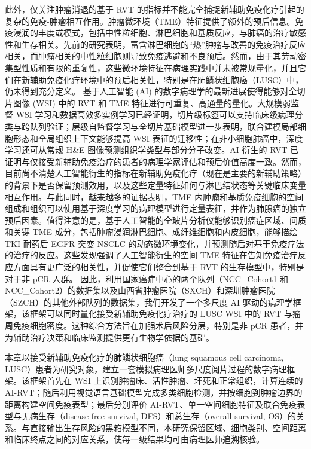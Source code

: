此外，仅关注肿瘤消退的基于 RVT 的指标并不能完全捕捉新辅助免疫化疗引起的复杂的免疫-肿瘤相互作用。肿瘤微环境（TME）特征提供了额外的预后信息。免疫浸润的丰度或模式，包括中性粒细胞、淋巴细胞和基质反应，与肺癌的治疗敏感性和生存相关\cite{wu2024coldhot,teijeira2021il8,miao2024neutrophilsnsclc,hu2025neutrophilpd1}。先前的研究表明，富含淋巴细胞的“热”肿瘤与改善的免疫治疗反应相关\cite{wu2024coldhot}，而肿瘤相关的中性粒细胞则导致免疫逃避和不良预后\cite{teijeira2021il8,miao2024neutrophilsnsclc,hu2025neutrophilpd1}。然而，由于其劳动密集型性质和有限的重复性，这些微环境特征在病理实践中并未被常规量化，并且它们在新辅助免疫化疗环境中的预后相关性，特别是在肺鳞状细胞癌（LUSC）中，仍未得到充分定义。
基于人工智能 (AI) 的数字病理学的最新进展使得能够对全切片图像 (WSI) 中的 RVT 和 TME 特征进行可重复、高通量的量化。大规模弱监督 WSI 学习和数据高效多实例学习已经证明，切片级标签可以支持临床级病理分类与跨队列验证\cite{campanella2019clinical,lu2021clam,ilse2018attentionmil,li2021dsmil,shao2021transmil}；层级自监督学习与全切片基础模型进一步表明，联合建模局部细胞形态和全局组织上下文能够提高 WSI 表征的迁移性\cite{chen2022hipt,xu2024gigapath}；在非小细胞肺癌中，深度学习还可从常规 H\&E 图像预测组织学类型与部分分子改变\cite{coudray2018lung}。AI 衍生的 RVT 已证明与仅接受新辅助免疫治疗的患者的病理学家评估和预后价值高度一致\cite{dacic2024lcmc3}。然而，目前尚不清楚人工智能衍生的指标在新辅助免疫化疗（现在是主要的新辅助策略）的背景下是否保留预测效用，以及这些定量特征如何与淋巴结状态等关键临床变量相互作用。与此同时，越来越多的证据表明，TME 内肿瘤和基质免疫细胞的空间组成和组织可以使用基于深度学习的病理模型进行定量表征，并作为肺腺癌的独立预后因素\cite{wang2020compstaining,wang2019convpath}。值得注意的是，基于人工智能的全玻片分析仪能够识别癌症区域、间质和关键 TME 成分，包括肿瘤浸润淋巴细胞、成纤维细胞和内皮细胞，能够描绘 TKI 耐药后 EGFR 突变 NSCLC 的动态微环境变化，并预测随后对基于免疫疗法的治疗的反应\cite{bang2025egfrspatial}。这些发现强调了人工智能衍生的空间 TME 特征在告知免疫治疗反应方面具有更广泛的相关性，并促使它们整合到基于 RVT 的生存模型中，特别是对于非 pCR 人群。
因此，利用国家癌症中心的两个队列（NCC\_Cohort1 和 NCC\_Cohort2）的数据集以及山西省肿瘤医院（SXCH）和深圳肿瘤医院（SZCH）的其他外部队列的数据集，我们开发了一个多尺度 AI 驱动的病理学框架，该框架可以同时量化接受新辅助免疫化疗治疗的 LUSC WSI 中的 RVT 与瘤周免疫细胞密度。这种综合方法旨在加强术后风险分层，特别是非 pCR 患者，并为辅助治疗决策和临床监测提供更有生物学依据的基础。


本章以接受新辅助免疫化疗的肺鳞状细胞癌（lung squamous cell carcinoma, LUSC）患者为研究对象，建立一套模拟病理医师多尺度阅片过程的数字病理框架。该框架首先在 WSI 上识别肿瘤床、活性肿瘤、坏死和正常组织，计算连续的 AI-RVT；随后利用视觉语言基础模型完成多类细胞检测，并按细胞到肿瘤边界的距离构建空间免疫表型；最后分别评价 AI-RVT、单一空间细胞特征及联合免疫表型与无病生存（disease-free survival, DFS）和总生存（overall survival, OS）的关系。与直接输出生存风险的黑箱模型不同，本研究保留区域、细胞类别、空间距离和临床终点之间的对应关系，使每一级结果均可由病理医师追溯核验。

